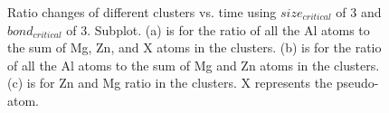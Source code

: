 \begingroup
\begin{figure}[!ht]
  \centering
\caption[Ratio changes of different clusters vs. time using $size_{critical}$ of 3 and $bond_{critical}$ of 3.]{Ratio changes of different clusters vs. time using $size_{critical}$ of 3 and $bond_{critical}$ of 3. Subplot. (a) is for the ratio of all the Al atoms to the sum of Mg, Zn, and X atoms in the clusters. (b) is for the ratio of all the Al atoms to the sum of Mg and Zn atoms in the clusters. (c) is for Zn and Mg ratio in the clusters. X represents the pseudo-atom.}
\label{Chap:Al/Vac:fig:sens_cluster_ratio}
\end{figure}
\endgroup


